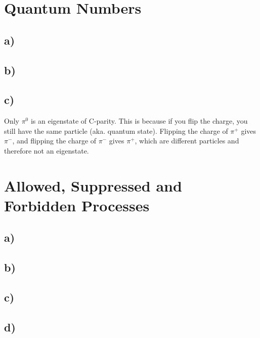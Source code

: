 \documentclass{article}
\begin{document}
\section{Quantum Numbers}

\subsection*{a)}


\subsection*{b)}


\subsection*{c)}
Only $π^{0}$ is an eigenstate of C-parity. This is because if you flip the charge, you still have the same particle (aka. quantum state). Flipping the charge of $π^{+}$ gives $π^{-}$, and flipping the charge of $π^{-}$ gives $π^{+}$, which are different particles and therefore not an eigenstate. 


\section{Allowed, Suppressed and Forbidden Processes}
\subsection*{a)}


\subsection*{b)}


\subsection*{c)}


\subsection*{d)}
\end{document}
